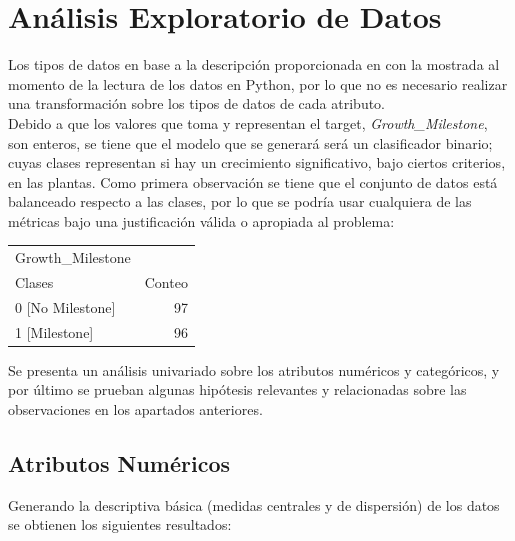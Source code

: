\documentclass[12pt,a4paper]{article}
\begin{document}
    \section{Análisis Exploratorio de Datos}\label{sec:eda}
    {
        Los tipos de datos en base a la descripción proporcionada en \cite{dataset_plants} 
        con la mostrada al momento de la lectura de los datos en Python, por lo que no 
        es necesario realizar una transformación sobre los tipos de datos de cada atributo. \\
        
        Debido a que los valores que toma y representan el target, \emph{Growth\_Milestone}, 
        son enteros, se tiene que el modelo que se generará será un clasificador binario; cuyas clases 
        representan si hay un crecimiento significativo, bajo ciertos criterios, en las plantas. 
        Como primera observación se tiene que el conjunto de datos está balanceado respecto 
        a las clases, por lo que se podría usar cualquiera de las métricas bajo una 
        justificación válida o apropiada al problema:

        \begin{center}
            \begin{tabular}{lr}
            \toprule
                Growth\_Milestone &  \\
                Clases & Conteo \\
            \midrule
                0 [No Milestone] & 97 \\
                1 [Milestone] & 96 \\
            \bottomrule
            \end{tabular}
        \end{center}
        
        Se presenta un análisis univariado sobre los atributos numéricos y categóricos, y 
        por último se prueban algunas hipótesis relevantes y relacionadas sobre las observaciones 
        en los apartados anteriores.

        \subsection{Atributos Numéricos}
        {
            Generando la descriptiva básica (medidas centrales y de dispersión) de 
            los datos se obtienen los siguientes resultados:

}}
\end{document}
